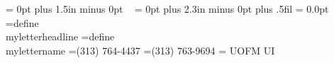 \def\globalfigurenumbers{\relax\if\figurecount<0\else\global\figurecount=-1\fi}



 \def\UGbody#1#2#3#4{
      \special {ps::[asis, begin]
         0 SPB
         save
           /showpage {} def
           /initgraphics {} def
           Xpos Ypos translate
           #4 dup scale
           #2 72 mul neg #3 72 mul neg translate
      }
      \special{ps: plotfile #1 asis}
      \special{ps::[asis,end]
          restore
          0 SPE
      }
 }
 \def\UGfigs{
   
   
   
   
 }



 \newskip{}      {} = 0pt plus 1.5in minus 0pt
 \newskip\spskip            {}\hbox{\ } 
 \newskip\signatureskip     \signatureskip=40pt
 \newskip{}   {} = 0pt plus 2.3in minus 0pt
 \newskip\frontpageskip     {}\medskipamount plus .5fil
 \newskip\headboxwidth      \headboxwidth= 0.0pt
 \newskip{}    {}
 \newskip{}        {}
 \newbox\headbox
 \newbox\headboxbox
 \newbox\physbox
 \newbox{}
 \newif\ifse@l              \se@ltrue
 \newif\iffrontpage
 \newif\ifletterstyle
 \newif\ifhe@dboxset        \he@dboxsetfalse
 \newtoks\memoheadline
 \newtoks{}
 \newtoks{}
 \newtoks{}
 \newtoks{}
 \newdimen\holder
 \newdimen\headboxwidth
 \newtoks\myletterheadline  \myletterheadline={define \\myletterheadline}
 \newtoks\mylettername    \mylettername={{\twentyfourbf define}\
\\mylettername}
 \newtoks\phonenumber       \phonenumber={\rm (313) 764-4437}
 \newtoks\faxnumber	    \faxnumber={(313) 763-9694}
 \newtoks\telexnumber       \telexnumber={ UOFM UI}



